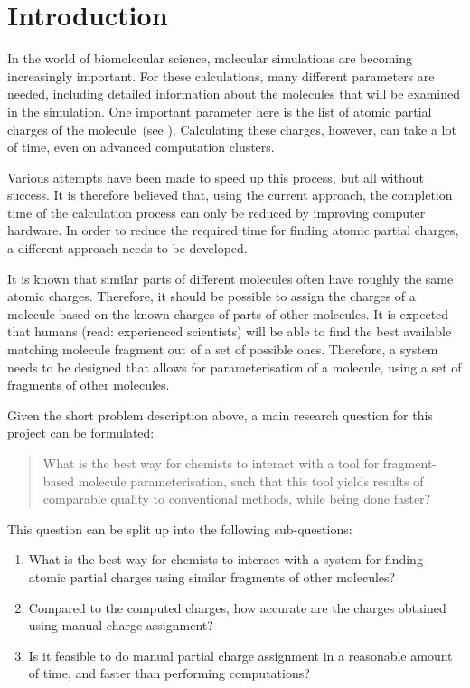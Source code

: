 \chapter{Introduction}

In the world of biomolecular science, molecular simulations are becoming increasingly important. For these calculations, many different parameters are needed, including detailed information about the molecules that will be examined in the simulation. One important parameter here is the list of atomic partial charges of the molecule~(see ). Calculating these charges, however, can take a lot of time, even on advanced computation clusters.

Various attempts have been made to speed up this process, but all without success. It is therefore believed that, using the current approach, the completion time of the calculation process can only be reduced by improving computer hardware. In order to reduce the required time for finding atomic partial charges, a different approach needs to be developed.

It is known that similar parts of different molecules often have roughly the same atomic charges. Therefore, it should be possible to assign the charges of a molecule based on the known charges of parts of other molecules. It is expected that humans (read: experienced scientists) will be able to find the best available matching molecule fragment out of a set of possible ones. Therefore, a system needs to be designed that allows for parameterisation of a molecule, using a set of fragments of other molecules.

Given the short problem description above, a main research question for this project can be formulated:
\begin{quote}
What is the best way for chemists to interact with a tool for fragment-based molecule parameterisation, such that this tool yields results of comparable quality to conventional methods, while being done faster?
\end{quote}

This question can be split up into the following sub-questions:
\begin{enumerate}
\item What is the best way for chemists to interact with a system for finding atomic partial charges using similar fragments of other molecules?
\item Compared to the computed charges, how accurate are the charges obtained using manual charge assignment?
\item Is it feasible to do manual partial charge assignment in a reasonable amount of time, and faster than performing computations?
\end{enumerate}


